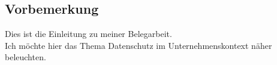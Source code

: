 \subsection{Vorbemerkung}
    

Dies ist die Einleitung zu meiner Belegarbeit.\\
Ich möchte hier das Thema Datenschutz im Unternehmenskontext näher beleuchten.